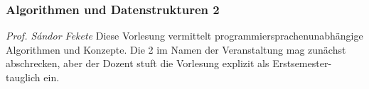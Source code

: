 \subsubsection{Algorithmen und Datenstrukturen 2}
	\textit{Prof. S\'andor Fekete}
	Diese Vorlesung vermittelt programmiersprachenunabhängige Algorithmen und Konzepte. Die \glqq{}2\grqq{} im Namen der Veranstaltung mag zunächst abschrecken, aber der Dozent stuft die Vorlesung explizit als Erstsemester-tauglich ein. 
